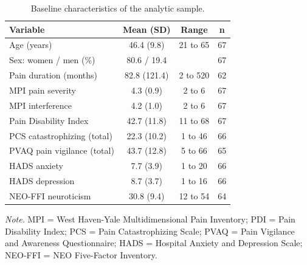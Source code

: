 \begin{table}[H]
\raggedright
\caption{Baseline characteristics of the analytic sample.}
\label{tab:sample}
\footnotesize
\begingroup
\setlength{\tabcolsep}{4pt}
\renewcommand{\arraystretch}{1.08}
\noindent
\begin{tabular*}{\textwidth}{@{\extracolsep{\fill}}lccc@{}}
\toprule
Variable & Mean (SD) & Range & n \\
\midrule
Age (years) & 46.4 (9.8) & 21 to 65 & 67 \\
Sex: women / men (\%) & 80.6 / 19.4 &  & 67 \\
Pain duration (months) & 82.8 (121.4) & 2 to 520 & 62 \\
MPI pain severity & 4.3 (0.9) & 2 to 6 & 67 \\
MPI interference & 4.2 (1.0) & 2 to 6 & 67 \\
Pain Disability Index & 42.7 (11.8) & 11 to 68 & 67 \\
PCS catastrophizing (total) & 22.3 (10.2) & 1 to 46 & 66 \\
PVAQ pain vigilance (total) & 43.7 (12.8) & 5 to 66 & 65 \\
HADS anxiety & 7.7 (3.9) & 1 to 20 & 66 \\
HADS depression & 8.7 (3.7) & 1 to 16 & 66 \\
NEO-FFI neuroticism & 30.8 (9.4) & 12 to 54 & 64 \\
\bottomrule
\end{tabular*}
\par\vspace{3pt}\noindent\parbox{\textwidth}{\footnotesize\textit{Note.} MPI = West Haven-Yale Multidimensional Pain Inventory; PDI = Pain Disability Index; PCS = Pain Catastrophizing Scale; PVAQ = Pain Vigilance and Awareness Questionnaire; HADS = Hospital Anxiety and Depression Scale; NEO-FFI = NEO Five-Factor Inventory.}
\endgroup
\end{table}
